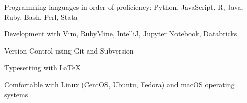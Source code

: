 

\begin{cvparagraph}

      \begin{cvitems}
        \item Programming languages in order of proficiency: Python, JavaScript, R, Java, Ruby, Bash, Perl, Stata
        \item Development with Vim, RubyMine, IntelliJ, Jupyter Notebook, Databricks
        \item Version Control using Git and Subversion
        \item Typesetting with LaTeX
        \item Comfortable with Linux (CentOS, Ubuntu, Fedora) and macOS operating systems
      \end{cvitems}

\end{cvparagraph}
